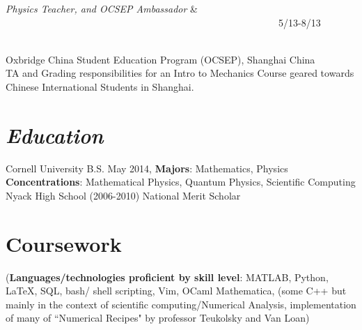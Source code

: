 \documentclass{res}
\begin{document}
{\begin{resume}
\begin{ncolumn}{2}
{\it Physics Teacher, and OCSEP Ambassador}  &   ~~~~~~~~~~~~~~~~~~~~~~~~~~~~~~~~~~~~~~~~~~~~~~~~~~~~~~~~5/13-8/13
\end{ncolumn}\\
Oxbridge China Student Education Program (OCSEP), Shanghai China\\
TA and Grading responsibilities for an Intro to Mechanics Course geared towards Chinese International Students in Shanghai.


\section{\sl\bf  Education}
Cornell University B.S. May 2014,
\textbf{Majors}: Mathematics, Physics \textbf{Concentrations}: Mathematical
Physics, Quantum Physics, Scientific Computing
Nyack High School (2006-2010)
National Merit Scholar

\section{\textbf{Coursework}}
({\bf Languages/technologies proficient by skill level}:
MATLAB, Python, LaTeX, SQL, bash/ shell scripting, Vim, OCaml Mathematica, (some C++ but mainly in the context of scientific computing/Numerical Analysis, implementation of many of ``Numerical Recipes" by professor Teukolsky and Van Loan)


\end{resume}}
\end{document}
